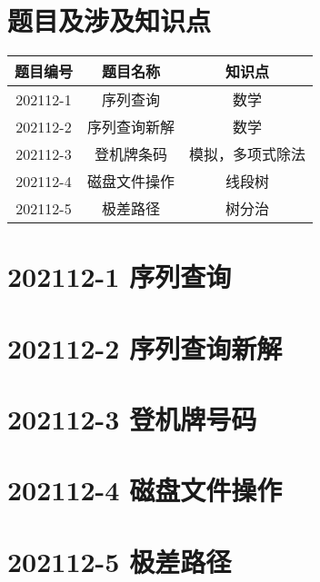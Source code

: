 \documentclass[cn,10pt,math=newtx,citestyle=gb7714-2015,bibstyle=gb7714-2015]{elegantbook}
\newif\ifonlyanalyze %
\begin{document}
\section{题目及涉及知识点}

\begin{table}[htbp]
    \centering
    \begin{tabular}{ccc}
        \toprule
        题目编号 & 题目名称     & 知识点           \\
        \midrule
        202112-1 & 序列查询     & 数学             \\
        202112-2 & 序列查询新解 & 数学             \\
        202112-3 & 登机牌条码   & 模拟，多项式除法 \\
        202112-4 & 磁盘文件操作 & 线段树           \\
        202112-5 & 极差路径     & 树分治           \\
        \bottomrule
    \end{tabular}
\end{table}

\newpage
\section{202112-1 序列查询}
\ifonlyanalyze
\else
    
\fi


\newpage
\section{202112-2 序列查询新解}
\ifonlyanalyze
\else
    
\fi


\newpage
\section{202112-3 登机牌号码}
\ifonlyanalyze
\else
    
\fi


\newpage
\section{202112-4 磁盘文件操作}
\ifonlyanalyze
\else
    
\fi


\newpage
\section{202112-5 极差路径}
\ifonlyanalyze
\else
    
\fi

\end{document}
